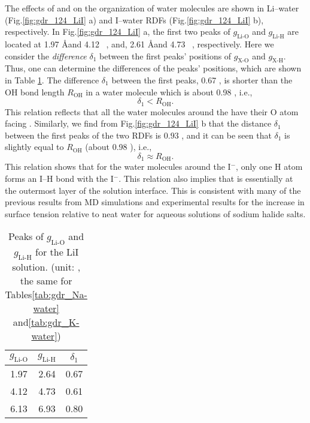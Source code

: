 The effects of \Li and \I on the organization of water molecules are shown in Li--water (Fig.\thinspace\ref{fig:gdr_124_LiI} a) 
and I--water RDFs (Fig.\thinspace\ref{fig:gdr_124_LiI} b), respectively.  
In Fig.\thinspace\ref{fig:gdr_124_LiI} a, the first two peaks of $g_{\text{Li-O}}$ and $g_{\text{Li-H}}$ are located at 1.97 \AA and 4.12 \ \A,  
and, 2.61 \AA and 4.73 \ \A, respectively. 
Here we consider the \emph{difference} $\delta_1$ between the first peaks' positions of $g_{\text{X-O}}$ and $g_{\text{X-H}}$. 
Thus, one can determine the differences of the peaks' positions, which are shown in Table \ref{tab:gdr_Li-water}. 
The difference $\delta_1$ between the first peaks, 0.67 \A, is shorter than the OH bond length $R_{\text{OH}}$ in a water molecule which is about 0.98 \A, i.e.,
\begin{equation}
\delta_1 < R_{\text{OH}}.
\label{lt_OH}
\end{equation}
This relation reflects that all the water molecules around the \Li have their O atom facing \li. 
Similarly, we find from Fig.\thinspace\ref{fig:gdr_124_LiI} b that the distance $\delta_1$ between the first peaks of the 
two RDFs is $0.93$ \A, and it can be seen that $\delta_1$ is slightly equal to $R_{\text{OH}}$ (about 0.98 \A), i.e., 
\begin{equation}
\delta_1 \approx R_{\text{OH}}.
\label{almost_OH}
\end{equation}
This relation shows that for the water molecules around the I$^-$, only one H atom forms an I--H bond with the I$^-$. 
This relation also implies that \I is essentially at the outermost layer of the solution interface. 
This is consistent with many of the previous results from MD simulations\cite{Dang2002,Jungwirth2001} 
and experimental results for the increase in surface tension relative to neat water for aqueous solutions of sodium halide salts\cite{Jungwirth2002,Vrbka2004,Garrett2004,Bajaj2016}.
\begin{table}[htbp] %
\centering
\caption{\label{tab:gdr_Li-water} 
Peaks of $g_{\text{Li-O}}$ and $g_{\text{Li-H}}$ for the LiI solution. (unit: \A, the same for Tables\thinspace\ref{tab:gdr_Na-water} and\thinspace\ref{tab:gdr_K-water})}
\begin{tabular}{ccc} %
  $g_{\text{Li-O}}$& $g_{\text{Li-H}}$ & $\delta_1$  \\
\hline
 1.97 & 2.64 & 0.67 \\
 4.12&4.73  &0.61  \\
 6.13 &6.93 & 0.80 
\end{tabular}
\end{table}
